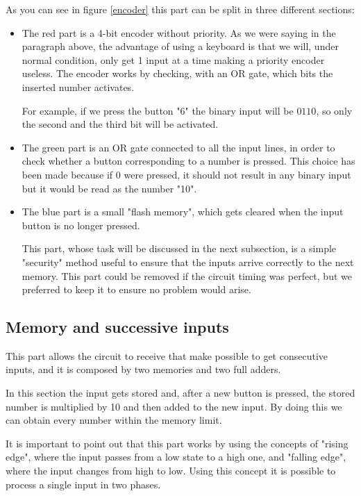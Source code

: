 \documentclass{article}
\begin{document}
As you can see in figure \ref{encoder} this part can be split in three different sections:

\begin{itemize}
    \item The red part is a 4-bit encoder without priority. As we were saying in the paragraph above, the advantage of using a keyboard is that we will, under normal condition, only get 1 input at a time making a priority encoder useless. The encoder works by checking, with an OR gate, which bits the inserted number activates.
    
    \vspace{1mm}

    For example, if we press the button "6" the binary input will be $0110$, so only the second and the third bit will be activated.

    \item The green part is an OR gate connected to all the input lines, in order to check whether a button corresponding to a number is pressed. This choice has been made because if 0 were pressed, it should not result in any binary input but it would be read as the number "10". 

    \item The blue part is a small "flash memory", which gets cleared when the input button is no longer pressed. 
            
        This part, whose task will be discussed in the next subsection, is a simple "security" method useful to ensure that the inputs arrive correctly to the next memory. This part could be removed if the circuit timing was perfect, but we preferred to keep it to ensure no problem would arise.    
\end{itemize}


\subsection{Memory and successive inputs}

This part allows the circuit to receive that make possible to get consecutive inputs, and it is composed by two memories and two full adders. 

In this section the input gets stored and, after a new button is pressed, the stored number is multiplied by 10 and then added to the new input. By doing this we can obtain every number within the memory limit.

It is important to point out that this part works by using the concepts of "rising edge", where the input passes from a low state to a high one, and "falling edge", where the input changes from high to low. Using this concept it is possible to process a single input in two phases.
\end{document}

